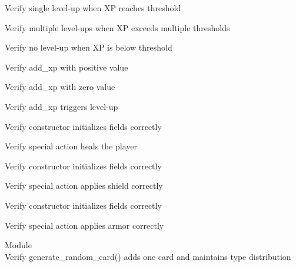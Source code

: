 \begin{DoxyRefList}
\label{test__test000090}%
%
Verify single level-\/up when XP reaches threshold  



\label{test__test000091}%
%
Verify multiple level-\/ups when XP exceeds multiple thresholds  



\label{test__test000092}%
%
Verify no level-\/up when XP is below threshold  



\label{test__test000093}%
%
Verify add\+\_\+xp with positive value  



\label{test__test000094}%
%
Verify add\+\_\+xp with zero value  



\label{test__test000096}%
%
Verify add\+\_\+xp triggers level-\/up  



\label{test__test000097}%
%
Verify  constructor initializes fields correctly  



\label{test__test000098}%
%
Verify  special action heals the player  



\label{test__test000099}%
%
Verify  constructor initializes fields correctly  



\label{test__test000100}%
%
Verify  special action applies shield correctly  



\label{test__test000101}%
%
Verify  constructor initializes fields correctly  



\label{test__test000102}%
%
Verify  special action applies armor correctly  


\item[Module \doxylink{group___hand}{Hand} ]\hfill \\
\label{test__test000066}%
%
Verify generate\+\_\+random\+\_\+card() adds one card and maintains type distribution  




\end{DoxyRefList}
